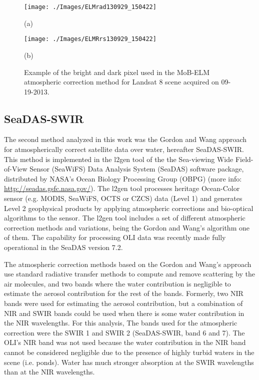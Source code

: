 \documentclass[]{spie}  %
\begin{document}
\begin{figure}[htb]
  \begin{minipage}[c]{0.48\linewidth}
    \centering
      \texttt{[image: ./Images/ELMrad130929\_150422]}
    \centerline{(a)}\medskip
  \end{minipage}
  \hfill
  \begin{minipage}[d]{0.48\linewidth}
    \centering
      \texttt{[image: ./Images/ELMRrs130929\_150422]}
    \centerline{(b)}\medskip
  \end{minipage}
  \caption{Example of the bright and dark pixel used in the MoB-ELM atmospheric correction method for Landsat 8 scene acquired on 09-19-2013.\label{fig:MOBELMpxls} } 
\end{figure}
\subsection{SeaDAS-SWIR}
\label{subsec:seadasswir}
The second method analyzed in this work was the Gordon and Wang\cite{Gordon:1994} approach for atmospherically correct satellite data over water, hereafter SeaDAS-SWIR. This method is implemented in the l2gen tool of the the Sea-viewing Wide Field-of-View Sensor (SeaWiFS) Data Analysis System (SeaDAS) software package, distributed by NASA's Ocean Biology Processing Group (OBPG) (more info: \url{http://seadas.gsfc.nasa.gov/}). The l2gen tool processes heritage Ocean-Color sensor (e.g. MODIS, SeaWiFS, OCTS or CZCS) data (Level 1) and generates Level 2 geophysical products by applying atmospheric corrections and bio-optical algorithms to the sensor. The l2gen tool includes a set of different atmospheric correction methods and variations, being the Gordon and Wang's algorithm one of them. The capability for processing OLI data was recently made fully operational in the SeaDAS version 7.2\cite{Franz:2015}. 

The atmospheric correction methods based on the Gordon and Wang's approach use standard radiative transfer methods to compute and remove scattering by the air molecules, and two bands where the water contribution is negligible to estimate the aerosol contribution for the rest of the bands. Formerly, two NIR bands were used for estimating the aerosol contribution, but a combination of NIR and SWIR bands could be used when there is some water contribution in the NIR wavelengths\cite{Wang2009}. For this analysis, The bands used for the atmospheric correction were the SWIR 1 and SWIR 2 (SeaDAS-SWIR, band 6 and 7). The OLI's NIR band was not used because the water contribution in the NIR band cannot be considered negligible due to the presence of highly turbid waters in the scene (i.e. ponds). Water has much stronger absorption at the SWIR wavelengths than at the NIR wavelengths. 
\end{document}
